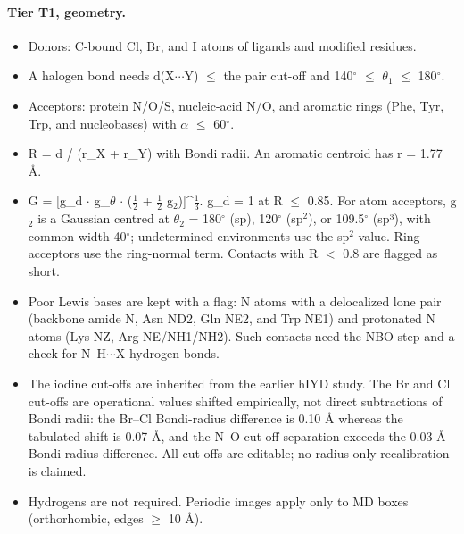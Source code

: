 \paragraph{Tier T1, geometry.}
\begin{itemize}[nosep,leftmargin=*]
\item Donors: C-bound Cl, Br, and I atoms of ligands and modified residues.
\item A halogen bond needs d(X$\cdots$Y) $\le$ the pair cut-off and 140$^\circ$ $\le$ $\theta_1$ $\le$ 180$^\circ$.
\item Acceptors: protein N/O/S, nucleic-acid N/O, and aromatic rings (Phe, Tyr, Trp, and nucleobases) with $\alpha$ $\le$ 60$^\circ$.
\item R = d / (r\_X + r\_Y) with Bondi radii. An aromatic centroid has r = 1.77 \AA{}.
\item G = [g\_d $\cdot$ g\_$\theta$ $\cdot$ ($\frac12$ + $\frac12$ g$_2$)]\^{}$\frac13$. g\_d = 1 at R $\le$ 0.85. For atom acceptors, g$_2$ is a Gaussian centred at $\theta_2$ = 180$^\circ$ (sp), 120$^\circ$ (sp$^2$), or 109.5$^\circ$ (sp³), with common width 40$^\circ$; undetermined environments use the sp$^2$ value. Ring acceptors use the ring-normal term. Contacts with R $<$ 0.8 are flagged as short.
\item Poor Lewis bases are kept with a flag: N atoms with a delocalized lone pair (backbone amide N, Asn ND2, Gln NE2, and Trp NE1) and protonated N atoms (Lys NZ, Arg NE/NH1/NH2). Such contacts need the NBO step and a check for N--H$\cdots$X hydrogen bonds.
\item The iodine cut-offs are inherited from the earlier hIYD study. The Br and Cl cut-offs are operational values shifted empirically, not direct subtractions of Bondi radii: the Br--Cl Bondi-radius difference is 0.10 \AA{} whereas the tabulated shift is 0.07 \AA{}, and the N--O cut-off separation exceeds the 0.03 \AA{} Bondi-radius difference. All cut-offs are editable; no radius-only recalibration is claimed.
\item Hydrogens are not required. Periodic images apply only to MD boxes (orthorhombic, edges $\ge$ 10 \AA{}).
\end{itemize}
